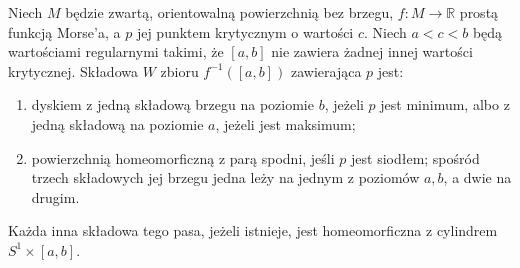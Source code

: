 \begin{lemat}
\label{lem:tg-reeb-critical-band}
Niech $M$ będzie zwartą, orientowalną powierzchnią bez brzegu,
$f:M\to\mathbb R$ prostą funkcją Morse'a, a $p$ jej punktem
krytycznym o wartości $c$. Niech $a<c<b$ będą wartościami
regularnymi takimi, że $[a,b]$ nie zawiera żadnej innej
wartości krytycznej.
Składowa $W$ zbioru $f^{-1}([a,b])$ zawierająca $p$ jest:
\begin{enumerate}[label=(\roman*)]
\item dyskiem z jedną składową brzegu na poziomie $b$,
jeżeli $p$ jest minimum, albo z jedną składową na poziomie
$a$, jeżeli jest maksimum;
\item powierzchnią homeomorficzną z parą spodni, jeśli
$p$ jest siodłem; spośród trzech składowych jej brzegu
jedna leży na jednym z poziomów $a,b$, a dwie na drugim.
\end{enumerate}
Każda inna składowa tego pasa, jeżeli istnieje, jest
homeomorficzna z cylindrem $S^1\times[a,b]$.
\end{lemat}

